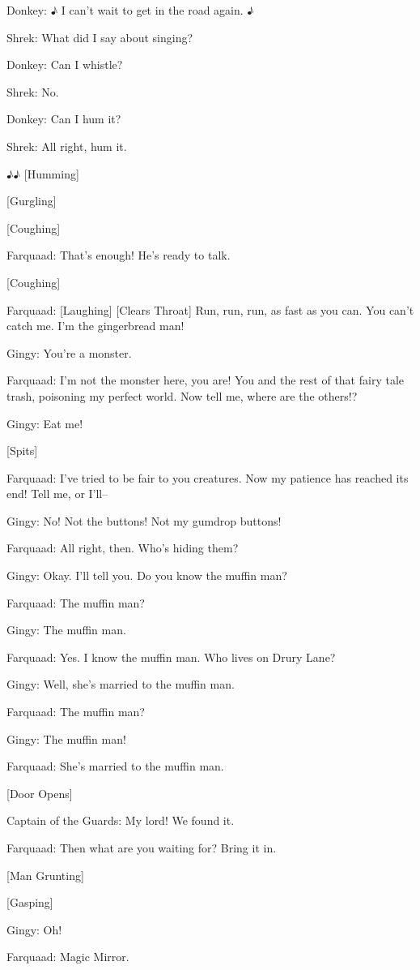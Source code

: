 \documentclass{article}
\begin{document}
Donkey:
♪ I can't wait to get in the road again. ♪

Shrek:
What did I say about singing?

Donkey:
Can I whistle?

Shrek:
No.

Donkey:
Can I hum it?

Shrek:
All right, hum it.

♪♪ [Humming]

[Gurgling]

[Coughing]

Farquaad:
That's enough! He's ready to talk.

[Coughing]

Farquaad:
[Laughing] [Clears Throat] Run, run, run, as fast as you can. You can't catch me. I'm the gingerbread man!

Gingy:
You're a monster.

Farquaad:
I'm not the monster here, you are! You and the rest of that fairy tale trash, poisoning my perfect world. Now tell me, where are the others!?

Gingy:
Eat me!

[Spits]

Farquaad:
I've tried to be fair to you creatures. Now my patience has reached its end! Tell me, or I'll--

Gingy:
No! Not the buttons! Not my gumdrop buttons!

Farquaad:
All right, then. Who's hiding them?

Gingy:
Okay. I'll tell you. Do you know the muffin man?

Farquaad:
The muffin man?

Gingy:
The muffin man.

Farquaad:
Yes. I know the muffin man. Who lives on Drury Lane?

Gingy:
Well, she's married to the muffin man.

Farquaad:
The muffin man?

Gingy:
The muffin man!

Farquaad:
She's married to the muffin man.

[Door Opens]

Captain of the Guards: My lord! We found it.

Farquaad:
Then what are you waiting for? Bring it in.

[Man Grunting]

[Gasping]

Gingy:
Oh!

Farquaad:
Magic Mirror.
\end{document}
